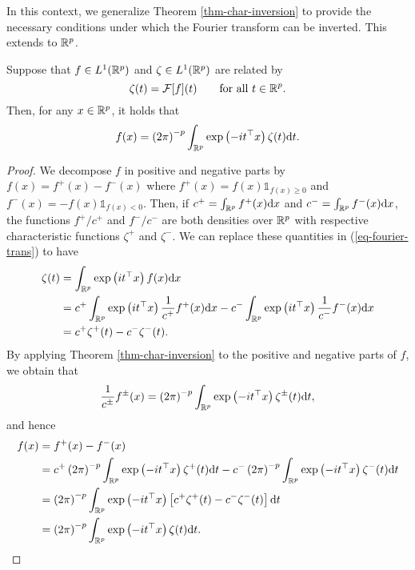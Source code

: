 In this context, we generalize Theorem \ref{thm-char-inversion} to provide the necessary conditions under which the Fourier transform can be inverted. This extends \cite[Corollary 2.4.3]{kolassa2006series} to ${\mathbb{R}^p}$.

\begin{corollary} \label{corr-fourier-inv}
    Suppose that $f \in L^1({\mathbb{R}^p})$ and $\zeta \in L^1({\mathbb{R}^p})$ are related by
    \begin{equation}\label{eq-fourier-trans}
        \zeta(t) = \mathcal{F}[f](t) \ \ \ \ \ \ {\textrm{for all }} t \in {\mathbb{R}^p}.
    \end{equation}
    Then, for any $x \in {\mathbb{R}^p}$, it holds that
    \begin{equation} \label{eq-fourier-inv}
        f(x) = \left(2\pi\right)^{-p}\int_{\mathbb{R}^p} \exp\left(-i t^\top x\right) \zeta(t) \text{d} t.
    \end{equation}
\end{corollary}

\begin{proof}
    We decompose $f$ in positive and negative parts by $f(x) = f^+(x) - f^-(x)$ where $f^+(x) = f(x) \mathbb{1}_{f(x) \geq 0}$ and $f^-(x) = -f(x) \mathbb{1}_{f(x) < 0}$. Then, if $c^+ = \int_{\mathbb{R}^p} f^+(x) \text{d} x$ and $c^- = \int_{\mathbb{R}^p} f^-(x) \text{d} x$, the functions $f^+ / c^+$ and $f^- / c^-$ are both densities over ${\mathbb{R}^p}$ with respective characteristic functions $\zeta^+$ and $\zeta^-$. We can replace these quantities in (\ref{eq-fourier-trans}) to have
    \begin{align*}
        \zeta(t) 
        &= \int_{\mathbb{R}^p} \exp\left(it^\top x\right)f(x)\text{d} x \\
        &= c^+ \int_{\mathbb{R}^p} \exp\left(it^\top x\right) \frac{1}{c^+}f^+(x)\text{d} x - c^- \int_{\mathbb{R}^p} \exp\left(it^\top x\right) \frac{1}{c^-}f^-(x)\text{d} x\\
        &= c^+ \zeta^+(t) - c^-\zeta^-(t).
    \end{align*}
    By applying Theorem \ref{thm-char-inversion} to the positive and negative parts of $f$, we obtain that
    \begin{equation*}
        \frac{1}{c^\pm} f^\pm(x) = \left(2\pi\right)^{-p}\int_{\mathbb{R}^p} \exp\left(-i t^\top x\right) \zeta^\pm(t) \text{d} t,
    \end{equation*}
    and hence
    \begin{align*}
        f(x) 
        &= f^+(x) - f^-(x) \\
        &= c^+ \left(2\pi\right)^{-p}\int_{\mathbb{R}^p} \exp\left(-i t^\top x\right) \zeta^+(t) \text{d} t
         - c^- \left(2\pi\right)^{-p}\int_{\mathbb{R}^p} \exp\left(-i t^\top x\right) \zeta^-(t) \text{d} t \\
        &= \left(2\pi\right)^{-p}\int_{\mathbb{R}^p} \exp\left(-i t^\top x\right) \left[ c^+\zeta^+(t) - c^-\zeta^-(t)\right] \text{d} t\\
        &= \left(2\pi\right)^{-p}\int_{\mathbb{R}^p} \exp\left(-i t^\top x\right) \zeta(t) \text{d} t. \qedhere
    \end{align*}
\end{proof}

